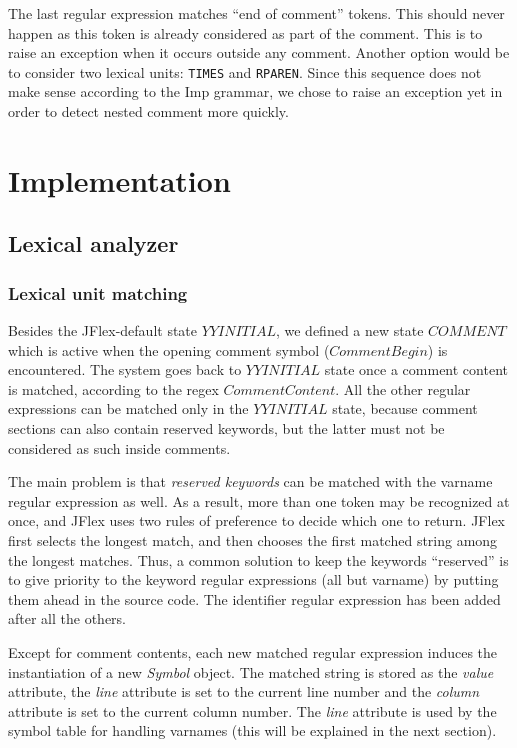 \documentclass[12pt]{report}
\begin{document}
The last regular expression matches ``end of comment'' tokens. This should never happen as this token is already
considered as part of the comment. This is to raise an exception when it occurs outside any comment. Another
option would be to consider two lexical units: \texttt{TIMES} and \texttt{RPAREN}. Since this sequence does not make sense
according to the Imp grammar, we chose to raise an exception yet in order to detect nested comment more quickly.

\chapter{Implementation}

\section{Lexical analyzer}

\subsection{Lexical unit matching}

Besides the JFlex-default state $YYINITIAL$, we defined a new state $COMMENT$ which is active when the opening comment symbol ($CommentBegin$) is encountered. The system goes back to $YYINITIAL$ state once a comment content is matched, according to the regex $CommentContent$.
All the other regular expressions can be matched only in the $YYINITIAL$ state, because comment sections can also contain reserved keywords, but the latter
must not be considered as such inside comments.


The main problem is that \textit{reserved keywords} can be matched with the varname regular expression as well. As a
result, more than one token may be recognized at once, and JFlex uses two rules of preference to decide which one to
return. JFlex first selects the longest match, and then chooses the first matched string among the longest matches.
Thus, a common solution to keep the keywords ``reserved'' is to give priority to the keyword regular expressions (all
but varname) by putting them ahead in the source code. The identifier regular expression has been added after all the others.


Except for comment contents, each new matched regular expression induces the instantiation of a new \textit{Symbol}
object.  The matched string is stored as the \textit{value} attribute, the \textit{line} attribute is set to the current
line number and the \textit{column} attribute is set to the current column number. The \textit{line} attribute is used
by the symbol table for handling varnames (this will be explained in the next section).
\end{document}
